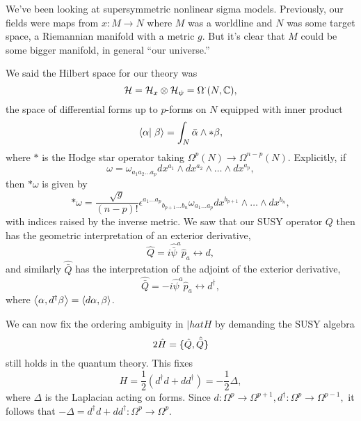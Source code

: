 We've been looking at supersymmetric nonlinear sigma models. Previously, our fields were maps from $x:M\to N$ where $M$ was a worldline and $N$ was some target space, a Riemannian manifold with a metric $g$. But it's clear that $M$ could be some bigger manifold, in general ``our universe.''

We said the Hilbert space for our theory was
\begin{equation}
    \mathcal H = \mathcal H_x \otimes \mathcal H_\psi = \Omega^\cdot (N,\mathbb{C}),
\end{equation}
the space of differential forms up to $p$-forms on $N$ equipped with inner product
\begin{equation}
    \braket{\alpha}{\beta} = \int_N \bar \alpha \wedge * \beta,
\end{equation}
where $*$ is the Hodge star operator taking $\Omega^p(N)\to \Omega^{n-p}(N)$. Explicitly, if 
\begin{equation*}
    \omega=\omega_{a_1a_2\ldots a_p}dx^{a_1}\wedge dx^{a_2}\wedge \ldots \wedge dx^{a_p},
\end{equation*} then $*\omega$ is given by
\begin{equation*}
    *\omega =\frac{\sqrt{g}}{(n-p)!} \epsilon^{a_1\ldots a_p}{}_{b_{p+1} \ldots b_n} \omega_{a_1\ldots a_p} dx^{b_{p+1}}\wedge \ldots \wedge dx^{b_n},
\end{equation*}
with indices raised by the inverse metric. We saw that our SUSY operator $Q$ then has the geometric interpretation of an exterior derivative,
\begin{equation}
    \hat Q = i\hat{\bar \psi}^a \hat p_a \leftrightarrow d,
\end{equation}
and similarly $\hat{\bar Q}$ has the interpretation of the adjoint of the exterior derivative,
\begin{equation}
    \hat {\bar Q} = -i\hat{ \psi}^a \hat p_a \leftrightarrow d^\dagger,
\end{equation}
where $\left< \alpha,d^\dagger \beta \right>=\left< d\alpha,\beta \right>$.

We can now fix the ordering ambiguity in $|hat H$ by demanding the SUSY algebra
\begin{equation}
2\hat H=\{\hat Q,\hat{\bar Q}\}
\end{equation}
still holds in the quantum theory. This fixes
\begin{equation}
    H=\frac{1}{2} (d^\dagger d+ dd^\dagger)=-\frac{1}{2} \Delta,
\end{equation}
where $\Delta$ is the Laplacian acting on forms. Since $d:\Omega^p \to \Omega^{p+1}, d^\dagger: \Omega^p \to \Omega^{p-1},$ it follows that $-\Delta=d^\dagger d+dd^\dagger: \Omega^p \to \Omega^p$.

